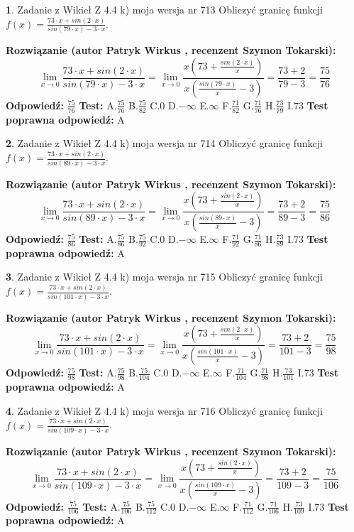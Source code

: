 \documentclass[12pt, a4paper]{article}
\theoremstyle{definition} %
\newtheorem{zad}{}
\newcommand{\zadStart}[1]{\begin{zad}#1\newline}
\newcommand{\zadStop}{\end{zad}}
\newcommand{\rozwStart}[2]{\noindent \textbf{Rozwiązanie (autor #1 , recenzent #2): }\newline}
\newcommand{\rozwStop}{\newline}
\newcommand{\odpStart}{\noindent \textbf{Odpowiedź:}\newline}
\newcommand{\odpStop}{\newline}
\newcommand{\testStart}{\noindent \textbf{Test:}\newline}
\newcommand{\testStop}{\newline}
\newcommand{\kluczStart}{\noindent \textbf{Test poprawna odpowiedź:}\newline}
\newcommand{\kluczStop}{\newline}
\begin{document}
\zadStart{Zadanie z Wikieł Z 4.4 k) moja wersja nr 713}
Obliczyć granicę funkcji $f(x)=\frac{73\cdot x +sin(2\cdot x)}{sin(79\cdot x) -3\cdot x}$.
\zadStop
\rozwStart{Patryk Wirkus}{Szymon Tokarski}
$$\lim\limits_{x\to 0}\frac{73\cdot x +sin(2\cdot x)}{sin(79\cdot x) -3\cdot x}
=\lim\limits_{x\to 0}\frac{x(73+\frac{sin(2\cdot x)}{x})}{x(\frac{sin(79\cdot x)}{x}-3)}
=\frac{73+2}{79-3} = \frac{75}{76}$$
\rozwStop
\odpStart
$\frac{75}{76}$
\odpStop
\testStart
A.$\frac{75}{76}$
B.$\frac{75}{82}$
C.$0$
D.$-\infty$
E.$\infty$
F.$\frac{71}{82}$
G.$\frac{71}{76}$
H.$\frac{73}{79}$
I.$73$
\testStop
\kluczStart
A
\kluczStop



\zadStart{Zadanie z Wikieł Z 4.4 k) moja wersja nr 714}
Obliczyć granicę funkcji $f(x)=\frac{73\cdot x +sin(2\cdot x)}{sin(89\cdot x) -3\cdot x}$.
\zadStop
\rozwStart{Patryk Wirkus}{Szymon Tokarski}
$$\lim\limits_{x\to 0}\frac{73\cdot x +sin(2\cdot x)}{sin(89\cdot x) -3\cdot x}
=\lim\limits_{x\to 0}\frac{x(73+\frac{sin(2\cdot x)}{x})}{x(\frac{sin(89\cdot x)}{x}-3)}
=\frac{73+2}{89-3} = \frac{75}{86}$$
\rozwStop
\odpStart
$\frac{75}{86}$
\odpStop
\testStart
A.$\frac{75}{86}$
B.$\frac{75}{92}$
C.$0$
D.$-\infty$
E.$\infty$
F.$\frac{71}{92}$
G.$\frac{71}{86}$
H.$\frac{73}{89}$
I.$73$
\testStop
\kluczStart
A
\kluczStop



\zadStart{Zadanie z Wikieł Z 4.4 k) moja wersja nr 715}
Obliczyć granicę funkcji $f(x)=\frac{73\cdot x +sin(2\cdot x)}{sin(101\cdot x) -3\cdot x}$.
\zadStop
\rozwStart{Patryk Wirkus}{Szymon Tokarski}
$$\lim\limits_{x\to 0}\frac{73\cdot x +sin(2\cdot x)}{sin(101\cdot x) -3\cdot x}
=\lim\limits_{x\to 0}\frac{x(73+\frac{sin(2\cdot x)}{x})}{x(\frac{sin(101\cdot x)}{x}-3)}
=\frac{73+2}{101-3} = \frac{75}{98}$$
\rozwStop
\odpStart
$\frac{75}{98}$
\odpStop
\testStart
A.$\frac{75}{98}$
B.$\frac{75}{104}$
C.$0$
D.$-\infty$
E.$\infty$
F.$\frac{71}{104}$
G.$\frac{71}{98}$
H.$\frac{73}{101}$
I.$73$
\testStop
\kluczStart
A
\kluczStop



\zadStart{Zadanie z Wikieł Z 4.4 k) moja wersja nr 716}
Obliczyć granicę funkcji $f(x)=\frac{73\cdot x +sin(2\cdot x)}{sin(109\cdot x) -3\cdot x}$.
\zadStop
\rozwStart{Patryk Wirkus}{Szymon Tokarski}
$$\lim\limits_{x\to 0}\frac{73\cdot x +sin(2\cdot x)}{sin(109\cdot x) -3\cdot x}
=\lim\limits_{x\to 0}\frac{x(73+\frac{sin(2\cdot x)}{x})}{x(\frac{sin(109\cdot x)}{x}-3)}
=\frac{73+2}{109-3} = \frac{75}{106}$$
\rozwStop
\odpStart
$\frac{75}{106}$
\odpStop
\testStart
A.$\frac{75}{106}$
B.$\frac{75}{112}$
C.$0$
D.$-\infty$
E.$\infty$
F.$\frac{71}{112}$
G.$\frac{71}{106}$
H.$\frac{73}{109}$
I.$73$
\testStop
\kluczStart
A
\kluczStop
\end{document}
